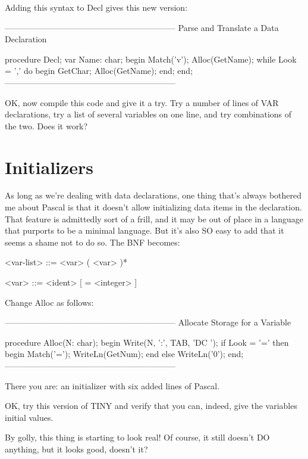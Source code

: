 \documentclass[float=false, crop=false]{standalone}
\begin{document}
Adding this syntax to Decl gives this new version:

\begin{code}
{--------------------------------------------------------------}
{ Parse and Translate a Data Declaration }

procedure Decl;
var Name: char;
begin
   Match('v');
   Alloc(GetName);
   while Look = ',' do begin
      GetChar;
      Alloc(GetName);
   end;
end;
{--------------------------------------------------------------}
\end{code}

OK, now compile this code and give it a try. Try a number of lines of VAR
declarations, try a list of several variables on one line, and try combinations
of the two. Does it work?


\section{Initializers}

As long as we're dealing with data declarations, one thing that's always
bothered me about Pascal is that it doesn't allow initializing data items in the
declaration. That feature is admittedly sort of a frill, and it may be out of
place in a language that purports to be a minimal language. But it's also SO
easy to add that it seems a shame not to do so. The BNF becomes:


     <var-list> ::= <var> ( <var> )*

     <var> ::= <ident> [ = <integer> ]

Change Alloc as follows:

\begin{code}
{--------------------------------------------------------------}
{ Allocate Storage for a Variable }

procedure Alloc(N: char);
begin
   Write(N, ':', TAB, 'DC ');
   if Look = '=' then begin
      Match('=');
      WriteLn(GetNum);
      end
   else
      WriteLn('0');
end;
{--------------------------------------------------------------}
\end{code}

There you are: an initializer with six added lines of Pascal.

OK, try this version of TINY and verify that you can, indeed, give the variables
initial values.

By golly, this thing is starting to look real! Of course, it still doesn't DO
anything, but it looks good, doesn't it?
\end{document}
